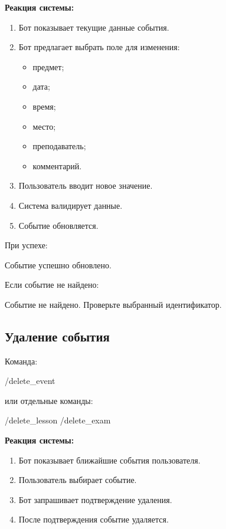 \documentclass[10pt,a4paper,final]{article} %
\begin{document}
\textbf{Реакция системы:}

\begin{enumerate}
    \item Бот показывает текущие данные события.
    \item Бот предлагает выбрать поле для изменения:
    \begin{itemize}
        \item предмет;
        \item дата;
        \item время;
        \item место;
        \item преподаватель;
        \item комментарий.
    \end{itemize}
    \item Пользователь вводит новое значение.
    \item Система валидирует данные.
    \item Событие обновляется.
\end{enumerate}

При успехе:

\begin{Code}
Событие успешно обновлено.
\end{Code}

Если событие не найдено:

\begin{Code}
Событие не найдено. Проверьте выбранный идентификатор.
\end{Code}

\subsection{Удаление события}

Команда:

\begin{Code}
/delete_event
\end{Code}

или отдельные команды:

\begin{Code}
/delete_lesson
/delete_exam
\end{Code}

\textbf{Реакция системы:}

\begin{enumerate}
    \item Бот показывает ближайшие события пользователя.
    \item Пользователь выбирает событие.
    \item Бот запрашивает подтверждение удаления.
    \item После подтверждения событие удаляется.
\end{enumerate}
\end{document}
